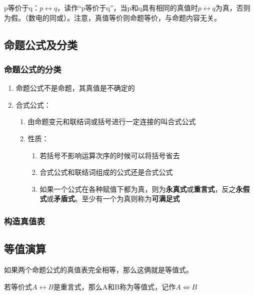 \documentclass{ctexart}
\numberwithin{figure}{section}
\numberwithin{equation}{section}
\numberwithin{table}{section}
\begin{document}
        p等价于q：$p \leftrightarrow q$，读作“p等价于q”，当p和q具有相同的真值时$p \leftrightarrow q$为真，否则为假。（数电的同或）。注意，真值等价则命题等价，与命题内容无关。

        \subsection{命题公式及分类}
            \subsubsection{命题公式的分类}
            \begin{enumerate}
            \item 命题公式不是命题，其真值是不确定的
            \item 合式公式：
                \begin{enumerate}
                    \item 由命题变元和联结词或括号进行一定连接的叫合式公式
                    \item 性质：
                        \begin{enumerate}
                            \item 若括号不影响运算次序的时候可以将括号省去
                            \item 合式公式和联结词组成的公式还是合式公式
                            \item 如果一个公式在各种赋值下都为真，则为\textbf{永真式}或\textbf{重言式}，反之\textbf{永假式}或\textbf{矛盾式}。至少有一个为真则称为\textbf{可满足式}
                        \end{enumerate}
                \end{enumerate}
            \end{enumerate}
            \subsubsection{构造真值表}

    \subsection{等值演算}
        如果两个命题公式的真值表完全相等，那么这俩就是等值式。

        若等价式$A\leftrightarrow B$是重言式，那么A和B称为等值式，记作$A\Leftrightarrow B$
\end{document}
